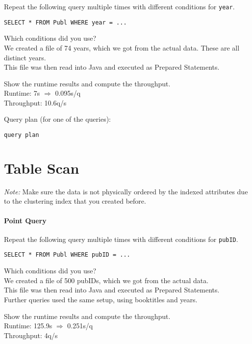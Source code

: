 \documentclass[11pt]{scrartcl}
\begin{document}
Repeat the following query multiple times with different conditions for {\tt year}.

{\small
\begin{verbatim}
SELECT * FROM Publ WHERE year = ...
\end{verbatim}
}

\noindent
Which conditions did you use?\\
We created a file of 74 years, which we got from the actual data. These are all distinct years.\\
This file was then read into Java and executed as Prepared Statements.

\smallskip\noindent
Show the runtime results and compute the throughput.\\
Runtime: 7s $\Rightarrow$ 0.095s/q\\
Throughput: 10.6q/s

\smallskip\noindent
Query plan (for one of the queries):
{\small
\begin{verbatim}
query plan
\end{verbatim}
}


\section{Table Scan}

\noindent \emph{Note:} Make sure the data is not physically ordered by
the indexed attributes due to the clustering index that you created
before.

\paragraph{Point Query}

Repeat the following query multiple times with different conditions for {\tt pubID}.

{\small
\begin{verbatim}
SELECT * FROM Publ WHERE pubID = ...
\end{verbatim}
}

\noindent
Which conditions did you use?\\
We created a file of 500 pubIDs, which we got from the actual data.\\
This file was then read into Java and executed as Prepared Statements.\\
Further queries used the same setup, using booktitles and years.

\smallskip\noindent
Show the runtime results and compute the throughput.\\
Runtime: 125.9s $\Rightarrow$ 0.251s/q\\
Throughput: 4q/s
\end{document}
